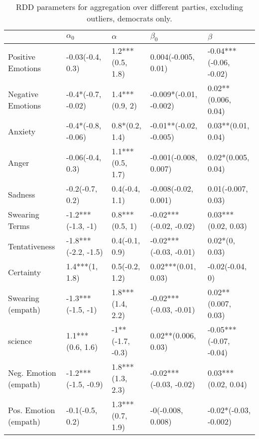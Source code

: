 \begin{table}[h]\centering
\caption{RDD parameters for aggregation over different parties, excluding outliers, democrats only.}
	\label{fig: Party_2}
\begin{adjustbox}{width=\linewidth, center}
	\begin{tabular}{lllll}
	\toprule
	{} &           $\alpha_0$ &          $\alpha$ &               $\beta_0$ &                 $\beta$ \\
	\midrule
	Positive Emotions     &     -0.03(-0.4, 0.3) &  1.2***(0.5, 1.8) &     0.004(-0.005, 0.01) &  -0.04***(-0.06, -0.02) \\
	Negative Emotions     &   -0.4*(-0.7, -0.02) &    1.4***(0.9, 2) &  -0.009*(-0.01, -0.002) &     0.02**(0.006, 0.04) \\
	Anxiety               &   -0.4*(-0.8, -0.06) &    0.8*(0.2, 1.4) &  -0.01**(-0.02, -0.005) &      0.03**(0.01, 0.04) \\
	Anger                 &     -0.06(-0.4, 0.3) &  1.1***(0.5, 1.7) &   -0.001(-0.008, 0.007) &      0.02*(0.005, 0.04) \\
	Sadness               &      -0.2(-0.7, 0.2) &    0.4(-0.4, 1.1) &    -0.008(-0.02, 0.001) &      0.01(-0.007, 0.03) \\
	Swearing Terms        &    -1.2***(-1.3, -1) &    0.8***(0.5, 1) &  -0.02***(-0.02, -0.02) &     0.03***(0.02, 0.03) \\
	Tentativeness         &  -1.8***(-2.2, -1.5) &    0.4(-0.1, 0.9) &  -0.02***(-0.03, -0.01) &          0.02*(0, 0.03) \\
	Certainty             &       1.4***(1, 1.8) &    0.5(-0.2, 1.2) &     0.02***(0.01, 0.03) &         -0.02(-0.04, 0) \\
	Swearing (empath)     &    -1.3***(-1.5, -1) &  1.8***(1.4, 2.2) &  -0.02***(-0.03, -0.01) &     0.02**(0.007, 0.03) \\
	science               &     1.1***(0.6, 1.6) &  -1**(-1.7, -0.3) &     0.02**(0.006, 0.03) &  -0.05***(-0.07, -0.04) \\
	Neg. Emotion (empath) &  -1.2***(-1.5, -0.9) &  1.8***(1.3, 2.3) &  -0.02***(-0.03, -0.02) &     0.03***(0.02, 0.04) \\
	Pos. Emotion (empath) &      -0.1(-0.5, 0.2) &  1.3***(0.7, 1.9) &       -0(-0.008, 0.008) &   -0.02*(-0.03, -0.002) \\
	\bottomrule
	\end{tabular}
	
\end{adjustbox}
	\end{table}

